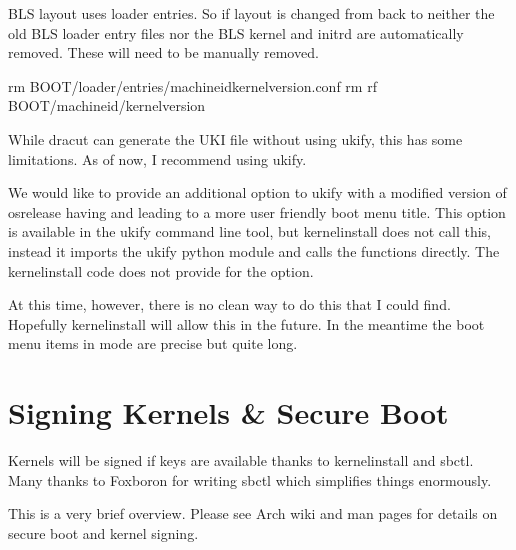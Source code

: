 \documentclass[letterpaper,11pt,english]{sphinxmanual}
\begin{document}
\sphinxAtStartPar
BLS layout uses  loader entries. So if layout is changed from  back to 
neither the old BLS loader entry files nor the BLS kernel and initrd are automatically removed.
These will need to be manually removed.

\begin{sphinxVerbatim}[commandchars=\\\{\}]
rm \PYGZdl{}BOOT/loader/entries/\PYGZlt{}\PYGZlt{}machine\PYGZhy{}id\PYGZgt{}\PYGZhy{}\PYGZlt{}kernel\PYGZhy{}version\PYGZgt{}.conf
rm \PYGZhy{}rf \PYGZdl{}BOOT/\PYGZlt{}machine\PYGZhy{}id\PYGZgt{}/\PYGZlt{}kernel\PYGZhy{}version\PYGZgt{}
\end{sphinxVerbatim}

\sphinxAtStartPar
While dracut can generate the UKI file without using ukify, this has some limitations.
As of now, I recommend using ukify.

\sphinxAtStartPar
We would like to provide an additional option  to ukify with a
modified version of os\sphinxhyphen{}release having  and   leading to
a more user friendly boot menu title. This option is available in the ukify
command line tool, but kernel\sphinxhyphen{}install does not call this, instead it imports
the ukify python module and calls the functions directly. The kernel\sphinxhyphen{}install
code does not provide for the  option.

\sphinxAtStartPar
At this time, however, there is no clean way to do this that I could find.
Hopefully kernel\sphinxhyphen{}install will allow this in the future. In the meantime
the boot menu items in  mode are precise but quite long.

\sphinxstepscope


\chapter{Signing Kernels \& Secure Boot}
\label{\detokenize{Signed-Kernels:signing-kernels-secure-boot}}\label{\detokenize{Signed-Kernels::doc}}
\sphinxAtStartPar
Kernels will be signed if keys are available thanks to kernel\sphinxhyphen{}install and sbctl.
Many thanks to Foxboron for writing sbctl which simplifies things enormously.

\sphinxAtStartPar
This is a very brief overview.
Please see Arch wiki and man pages for details on secure boot and kernel signing.
\end{document}
